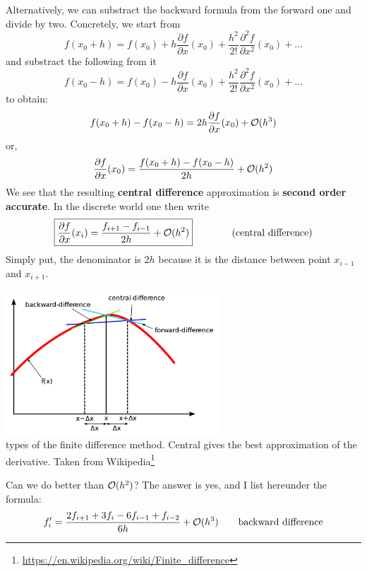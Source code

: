 Alternatively, we can substract the backward formula from the forward one 
and divide by two. Concretely, we start from 
\begin{equation}
f(x_0+h)=f(x_0)+ 
h \frac{\partial f}{\partial x}(x_0)  + 
\frac{h^2}{2!} \frac{\partial^2 f}{\partial x^2}(x_0)  + \dots  
\end{equation}
and substract the following from it
\begin{equation}
f(x_0-h)=f(x_0)-
h \frac{\partial f}{\partial x}(x_0)  + 
\frac{h^2}{2!} \frac{\partial^2 f}{\partial x^2}(x_0)  + \dots 
\end{equation}
to obtain:
\begin{equation}
f(x_0+h)-f(x_0-h) = 2h \frac{\partial f}{\partial x}(x_0)  +{\cal O}(h^3) 
\end{equation}
or, 
\[
\frac{\partial f}{\partial x}(x_0)  = \frac{ f(x_0+h)-f(x_0-h)}{2h} +{\cal O}(h^2) 
\]
We see that the resulting {\bf central difference} approximation is 
{\bf second order accurate}. In the discrete world one then write
\begin{equation}
\boxed{
\frac{\partial f}{\partial x}(x_i) 
= \frac{f_{i+1}-f_{i-1}}{2h} + {\cal O}(h^2)
}
\qquad
\qquad
\text{(central difference)} 
\end{equation}
Simply put, the denominator is $2h$ because it is the distance between point $x_{i-1}$ and $x_{i+1}$.


\begin{center}
\includegraphics[width=8cm]{images/fdm/fd1}\\
{ types of the finite difference method. Central gives the best approximation of the derivative.
Taken from Wikipedia\footnote{\url{https://en.wikipedia.org/wiki/Finite_difference}}
}
\end{center}

Can we do better than ${\cal O}(h^2)$? The answer is yes, and I list hereunder the 
formula:
\begin{equation}
f_i' = \frac{2 f_{i+1} + 3 f_i - 6 f_{i-1} + f_{i-2}}{6 h} + {\cal O}(h^3)
\qquad
\text{backward difference}
\end{equation}

